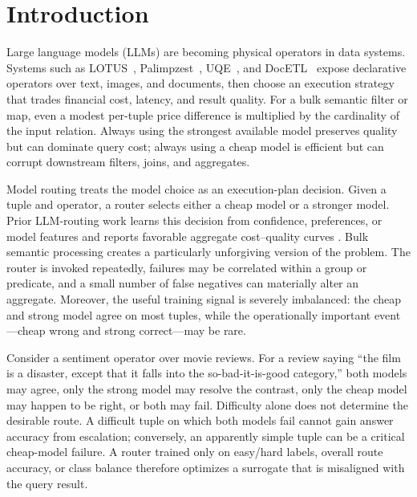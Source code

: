\section{Introduction}

Large language models (LLMs) are becoming physical operators in data systems.
Systems such as LOTUS~\cite{patel2025lotus},
Palimpzest~\cite{liu2025palimpzest}, UQE~\cite{dai2024uqe}, and
DocETL~\cite{shankar2025docetl} expose declarative operators over text, images,
and documents, then choose an execution strategy that trades financial cost,
latency, and result quality.
For a bulk semantic filter or map, even a modest per-tuple price difference is
multiplied by the cardinality of the input relation. Always using the strongest
available model preserves quality but can dominate query cost; always using a
cheap model is efficient but can corrupt downstream filters, joins, and
aggregates.

Model routing treats the model choice as an execution-plan decision. Given a
tuple and operator, a router selects either a cheap model or a stronger model.
Prior LLM-routing work learns this decision from confidence, preferences, or
model features and reports favorable aggregate cost--quality curves
\cite{chen2024frugalgpt,ong2025routellm,gupta2024cascades,jitkrittum2026uniroute}.
Bulk semantic processing creates a particularly unforgiving version of the
problem. The router is invoked repeatedly, failures may be correlated within a
group or predicate, and a small number of false negatives can materially alter
an aggregate. Moreover, the useful training signal is severely imbalanced:
the cheap and strong model agree on most tuples, while the operationally
important event---cheap wrong and strong correct---may be rare.

Consider a sentiment operator over movie reviews. For a review saying
``the film is a disaster, except that it falls into the so-bad-it-is-good
category,'' both models may agree, only the strong model may resolve the
contrast, only the cheap model may happen to be right, or both may fail.
Difficulty alone does not determine the desirable route. A difficult tuple on
which both models fail cannot gain answer accuracy from escalation; conversely,
an apparently simple tuple can be a critical cheap-model failure. A router
trained only on easy/hard labels, overall route accuracy, or class balance
therefore optimizes a surrogate that is misaligned with the query result.

